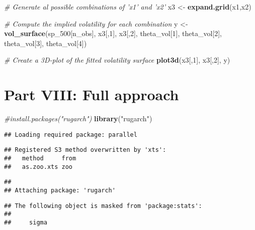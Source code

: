 \documentclass[]{article}
\newenvironment{Shaded}{\begin{snugshade}}{\end{snugshade}}
\newcommand{\CommentTok}[1]{\textcolor[rgb]{0.56,0.35,0.01}{\textit{#1}}}
\newcommand{\DecValTok}[1]{\textcolor[rgb]{0.00,0.00,0.81}{#1}}
\newcommand{\KeywordTok}[1]{\textcolor[rgb]{0.13,0.29,0.53}{\textbf{#1}}}
\newcommand{\NormalTok}[1]{#1}
\newcommand{\StringTok}[1]{\textcolor[rgb]{0.31,0.60,0.02}{#1}}
\begin{document}
\begin{Shaded}
\begin{Highlighting}[]
\CommentTok{# Generate al possible combinations of 'x1' and 'x2'}
\NormalTok{x3 <-}\StringTok{ }\KeywordTok{expand.grid}\NormalTok{(x1,x2)}

\CommentTok{# Compute the implied volatility for each combination}
\NormalTok{y  <-}\StringTok{ }\KeywordTok{vol_surface}\NormalTok{(sp_}\DecValTok{500}\NormalTok{[n_obs], x3[,}\DecValTok{1}\NormalTok{], x3[,}\DecValTok{2}\NormalTok{], theta_vol[}\DecValTok{1}\NormalTok{], theta_vol[}\DecValTok{2}\NormalTok{], theta_vol[}\DecValTok{3}\NormalTok{], theta_vol[}\DecValTok{4}\NormalTok{])}

\CommentTok{# Create a 3D-plot of the fitted volatility surface}
\KeywordTok{plot3d}\NormalTok{(x3[,}\DecValTok{1}\NormalTok{], x3[,}\DecValTok{2}\NormalTok{], y)}
\end{Highlighting}
\end{Shaded}

\hypertarget{part-viii-full-approach}{%
\section{Part VIII: Full approach}\label{part-viii-full-approach}}

\begin{Shaded}
\begin{Highlighting}[]
\CommentTok{#install.packages("rugarch")}
\KeywordTok{library}\NormalTok{(}\StringTok{"rugarch"}\NormalTok{)}
\end{Highlighting}
\end{Shaded}

\begin{verbatim}
## Loading required package: parallel
\end{verbatim}

\begin{verbatim}
## Registered S3 method overwritten by 'xts':
##   method     from
##   as.zoo.xts zoo
\end{verbatim}

\begin{verbatim}
## 
## Attaching package: 'rugarch'
\end{verbatim}

\begin{verbatim}
## The following object is masked from 'package:stats':
## 
##     sigma
\end{verbatim}
\end{document}
